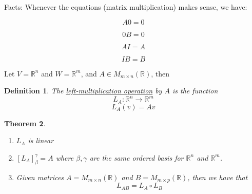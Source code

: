 \documentclass{article}
\newtheorem{theorem}{Theorem}[section]
\newtheorem{definition}[theorem]{Definition}
\newtheorem{one minute paper}[theorem]{One Minute Paper}
\begin{document}
Facts: Whenever the equations (matrix multiplication) makes sense, we have:

\begin{equation}
    A0 = 0
\end{equation}

\begin{equation}
    0B = 0
\end{equation}

\begin{equation}
    AI = A
\end{equation}

\begin{equation}
    IB = B
\end{equation}

Let $V = \mathbb{R}^n$ and $W = \mathbb{R}^m$, and $A \in M_{m\times n}(\mathbb{R})$, then 

\begin{definition}
    The \underline{left-multiplication operation} by $A$ is the function
    \begin{equation}
        L_A: \mathbb{R}^n \rightarrow \mathbb{R}^m
    \end{equation}
    \begin{equation}
        L_A(v) = Av
    \end{equation}
\end{definition}

\begin{theorem}
    \begin{enumerate}
        \item $L_A$ is linear
        \item $[L_A]_\beta^\gamma = A$ where $\beta, \gamma$ are the same ordered basis for $\mathbb{R}^n$ and $\mathbb{R}^m$. 
        \item Given matrices $A = M_{m \times n}(\mathbb{R})$ and $B = M_{m \times p}(\mathbb{R})$, then we have that 
        \begin{equation}
            L_{AB} = L_A \circ L_B
        \end{equation} 
    \end{enumerate}
\end{theorem}
\end{document}
